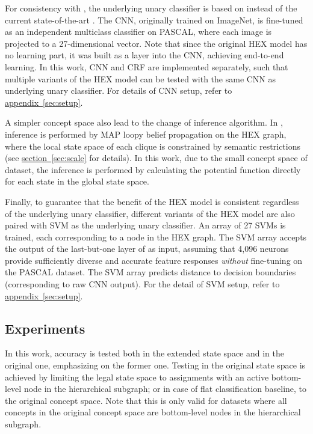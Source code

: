 \documentclass[11pt,a4paper]{article}
\begin{document}
For consistency with \cite{deng2014large}, the underlying unary classifier is based on \cite{krizhevsky2012imagenet} instead of the current state-of-the-art \cite{simonyan2014very}. The CNN, originally trained on ImageNet, is fine-tuned as an independent multiclass classifier on PASCAL, where each image is projected to a 27-dimensional vector. Note that since the original HEX model has no learning part, it was built as a layer into the CNN, achieving end-to-end learning. In this work, CNN and CRF are implemented separately, such that multiple variants of the HEX model can be tested with the same CNN as underlying unary classifier. For details of CNN setup, refer to \hyperref[sec:setup]{appendix~\ref{sec:setup}}.

A simpler concept space also lead to the change of inference algorithm. In \cite{deng2014large}, inference is performed by MAP loopy belief propagation on the HEX graph, where the local state space of each clique is constrained by semantic restrictions (see \hyperref[sec:scale]{section~\ref{sec:scale}} for details). In this work, due to the small concept space of dataset, the inference is performed by calculating the potential function directly for each state in the global state space.

Finally, to guarantee that the benefit of the HEX model is consistent regardless of the underlying unary classifier, different variants of the HEX model are also paired with SVM as the underlying unary classifier. An array of 27 SVMs is trained, each corresponding to a node in the HEX graph. The SVM array accepts the output of the last-but-one layer of \cite{krizhevsky2012imagenet} as input, assuming that 4,096 neurons provide sufficiently diverse and accurate feature responses \emph{without} fine-tuning on the PASCAL dataset. The SVM array predicts distance to decision boundaries (corresponding to raw CNN output). For the detail of SVM setup, refer to \hyperref[sec:setup]{appendix~\ref{sec:setup}}.

\subsection{Experiments}
\label{sec:exp1}

In this work, accuracy is tested both in the extended state space and in the original one, emphasizing on the former one. Testing in the original state space is achieved by limiting the legal state space to assignments with an active bottom-level node in the hierarchical subgraph; or in case of flat classification baseline, to the original concept space. Note that this is only valid for datasets where all concepts in the original concept space are bottom-level nodes in the hierarchical subgraph.
\end{document}
